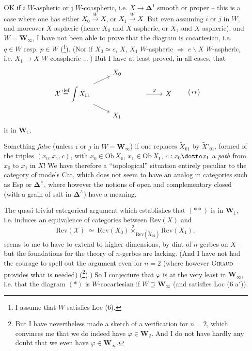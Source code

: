 OK if $i$ $W$-aspheric or j $W$-coaspheric, i.e. $X \longrightarrow \boldsymbol{\Delta}^1$ smooth or proper -- this is a case where one has either $X_0 \xrightarrow{W} X$, or $X_1 \xrightarrow{W} X$. But even assuming $i$ or $j$ in $W$, and moreover $X$ aspheric (hence $X_0$ and $X$ aspheric, or $X_1$ and $X$ aspheric), and $W = \mathbf{W}_\infty$, I have not been able to prove that the diagram is cocartesian, i.e. $q \in W$ resp. $p \in W$ (\footnote[9]{I assume that $W$ satisfies Loc (6).}). (Nor if $X_0 \simeq e$, $X$, $X_1$ $W$-aspheric $\Longrightarrow$ $e\backslash X$ $W$-aspheric, i.e. $X_1 \longrightarrow X$ $W$-coaspheric $\ldots$\,) But I have at least proved, in all cases, that %
\[
\begin{tikzcd}[row sep=small]
 & X_0 & & \\
\mathcal{X} \overset{\text{def}}{=} \displaystyle\int \tilde{X}_{01} \arrow[ur] \arrow[dr] & & {} \arrow[r, "\varphi"] & X \\
 & X_1 & &
\end{tikzcd}
\tag*{$(**)$} %
\]
is in $\mathbf{W}_1$.

Something \textit{false} (unless $i$ or $j$ in $W = \mathbf{W}_\infty$) if one replaces $\tilde{X}_{01}$ by $\tilde{X}'_{01}$, formed of the triples $(x_0, x_1, c)$, with $x_0 \in \mathrm{Ob}\,X_0$, $x_1 \in \mathrm{Ob}\,X_1$, $c : x_0 \dotto x_1$ a \textit{path} from $x_0$ to $x_1$ in $X$! We have
therefore a ``topological'' situation entirely peculiar to the category of models Cat, which does not seem to have an analog in categories such as Esp or $\boldsymbol{\Delta}^\wedge$, where however the notions of open and complementary closed (with a grain of salt in $\boldsymbol{\Delta}^\wedge$) have a meaning.

The quasi-trivial categorical argument which establishes that $(**)$ is in $\mathbf{W}_1$, i.e. induces an equivalence of categories between $\mathrm{Rev}(X)$ and
\[ \mathrm{Rev}(\mathcal{X}) \ \simeq \ \mathrm{Rev}(X_0) \overset{2}{\times}_{\mathrm{Rev}(\tilde{X}_{01})} \mathrm{Rev}(X_1), \]
seems to me to have to extend to higher dimensions, by dint of $n$-gerbes on $X$ -- but the foundations for the theory of $n$-gerbes are lacking. (And I have not had the courage to spell out the argument even for $n = 2$ (where however \textsc{Giraud} provides what is needed) (\footnote[10]{But I have nevertheless made a sketch of a verification for $n = 2$, which convinces me that we do indeed have $\varphi \in \mathbf{W}_2$. And I do not have hardly any doubt that we even have $\varphi \in \mathbf{W}_\infty$.}).) So I conjecture that $\varphi$ is at the very least in $\mathbf{W}_\infty$, i.e. that the diagram $(*)$ is $W$-cocartesian if $W \supseteq \mathbf{W}_\infty$ (and satisfies Loc (6 a$'$)). %